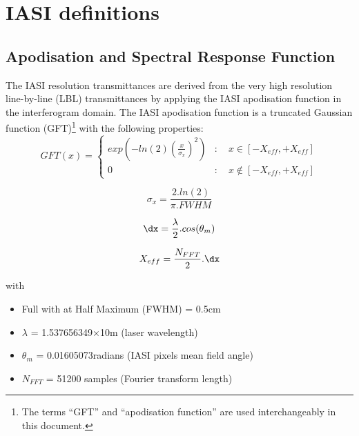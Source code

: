 \section{IASI definitions}

\subsection{Apodisation and Spectral Response Function}

The IASI resolution transmittances are derived from the very high resolution line-by-line (LBL) transmittances by applying the IASI apodisation function in the interferogram domain. The IASI apodisation function is a truncated Gaussian function (GFT)\footnote{The terms ``GFT'' and ``apodisation function'' are used interchangeably in this document.} with the following properties\cite{IASI_GFTPPT}:
\begin{equation}
  GFT(x) = \begin{cases}
             exp\left(-ln(2)\left( \frac{x}{\sigma_{x}} \right) ^2\right) & :\quad x \in [-X_{eff},+X_{eff}] \\
             0                                                            & :\quad x \notin [-X_{eff},+X_{eff}]
           \end{cases}
\end{equation}

\begin{equation}
  \sigma_{x} = \frac{2.ln(2)}{\pi.FWHM}
\end{equation}

\begin{equation}
  \dx = \frac{\lambda}{2}.cos(\theta_{m})
  \label{eqn:dx_eff}
\end{equation}

\begin{equation}
  X_{eff} = \frac{N_{FFT}}{2}.\dx
  \label{eqn:x_eff}
\end{equation}

with
\begin{itemize}
  \item{Full with at Half Maximum (FWHM) = 0.5cm}
  \item{$\lambda$ = 1.537656349$\times$10m (laser wavelength)}
  \item{$\theta_{m}$ = 0.01605073radians (IASI pixels mean field angle)}
  \item{$N_{FFT}$ = 51200 samples (Fourier transform length)}
\end{itemize}

